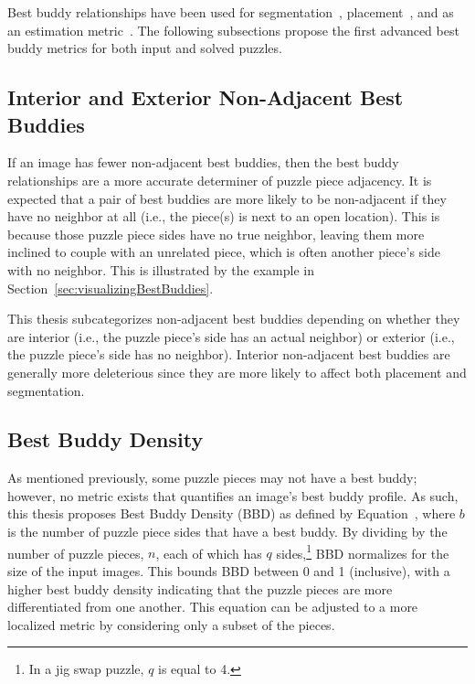 Best buddy relationships have been used for segmentation~\cite{pomeranz2011}, placement~\cite{paikin2015}, and as an estimation metric~\cite{sholomon2013}.  The following subsections propose the first advanced best buddy metrics for both input and solved puzzles.

\subsection{Interior and Exterior Non-Adjacent Best Buddies}\label{sec:bestBuddyInteriorExterior}

If an image has fewer non-adjacent best buddies, then the best buddy relationships are a more accurate determiner of puzzle piece adjacency.  It is expected that a pair of best buddies are more likely to be non-adjacent if they have no neighbor at all (i.e., the piece(s) is next to an open location).  This is because those puzzle piece sides have no true neighbor, leaving them more inclined to couple with an unrelated piece, which is often another piece's side with no neighbor.  This is illustrated by the example in Section~\ref{sec:visualizingBestBuddies}.

This thesis subcategorizes non-adjacent best buddies depending on whether they are interior (i.e., the puzzle piece's side has an actual neighbor) or exterior (i.e., the puzzle piece's side has no neighbor).  Interior non-adjacent best buddies are generally more deleterious since they are more likely to affect both placement and segmentation. 

\subsection{Best Buddy Density}\label{sec:bestBuddyDensity}

As mentioned previously, some puzzle pieces may not have a best buddy; however, no metric exists that quantifies an image's best buddy profile.  As such, this thesis proposes Best Buddy Density (BBD) as defined by Equation~, where $b$ is the number of puzzle piece sides that have a best buddy.  By dividing by the number of puzzle pieces, $n$, each of which has $q$ sides,\footnote{In a jig swap puzzle, $q$ is equal to 4.} BBD normalizes for the size of the input images. This bounds BBD between 0 and 1 (inclusive), with a higher best buddy density indicating that the puzzle pieces are more differentiated from one another.  This equation can be adjusted to a more localized metric by considering only a subset of the pieces.

